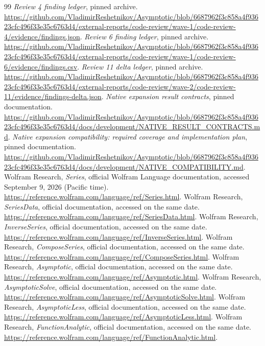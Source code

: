 \documentclass[11pt,letterpaper]{article}
\theoremstyle{definition}\newtheorem{definition}[proposition]{Definition}
\begin{document}
\begin{thebibliography}{99}
 \emph{Review 4 finding ledger}, pinned archive. \url{https://github.com/VladimirReshetnikov/Asymptotic/blob/6687962f3c858a4f93623cfc496f33e35c6763d4/external-reports/code-review/wave-1/code-review-4/evidence/findings.json}.
 \emph{Review 6 finding ledger}, pinned archive. \url{https://github.com/VladimirReshetnikov/Asymptotic/blob/6687962f3c858a4f93623cfc496f33e35c6763d4/external-reports/code-review/wave-1/code-review-6/evidence/findings.csv}.
 \emph{Review 11 delta ledger}, pinned archive. \url{https://github.com/VladimirReshetnikov/Asymptotic/blob/6687962f3c858a4f93623cfc496f33e35c6763d4/external-reports/code-review/wave-2/code-review-11/evidence/findings-delta.json}.
 \emph{Native expansion result contracts}, pinned documentation. \url{https://github.com/VladimirReshetnikov/Asymptotic/blob/6687962f3c858a4f93623cfc496f33e35c6763d4/docs/development/NATIVE_RESULT_CONTRACTS.md}.
 \emph{Native expansion compatibility: required coverage and implementation plan}, pinned documentation. \url{https://github.com/VladimirReshetnikov/Asymptotic/blob/6687962f3c858a4f93623cfc496f33e35c6763d4/docs/development/NATIVE_COMPATIBILITY.md}.
 Wolfram Research, \emph{Series}, official Wolfram Language documentation, accessed September 9, 2026 (Pacific time). \url{https://reference.wolfram.com/language/ref/Series.html}.
 Wolfram Research, \emph{SeriesData}, official documentation, accessed on the same date. \url{https://reference.wolfram.com/language/ref/SeriesData.html}.
 Wolfram Research, \emph{InverseSeries}, official documentation, accessed on the same date. \url{https://reference.wolfram.com/language/ref/InverseSeries.html}.
 Wolfram Research, \emph{ComposeSeries}, official documentation, accessed on the same date. \url{https://reference.wolfram.com/language/ref/ComposeSeries.html}.
 Wolfram Research, \emph{Asymptotic}, official documentation, accessed on the same date. \url{https://reference.wolfram.com/language/ref/Asymptotic.html}.
 Wolfram Research, \emph{AsymptoticSolve}, official documentation, accessed on the same date. \url{https://reference.wolfram.com/language/ref/AsymptoticSolve.html}.
 Wolfram Research, \emph{AsymptoticLess}, official documentation, accessed on the same date. \url{https://reference.wolfram.com/language/ref/AsymptoticLess.html}.
 Wolfram Research, \emph{FunctionAnalytic}, official documentation, accessed on the same date. \url{https://reference.wolfram.com/language/ref/FunctionAnalytic.html}.
\end{thebibliography}
\end{document}

